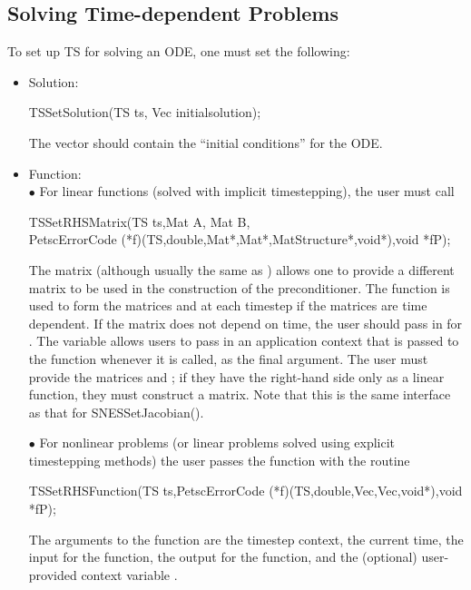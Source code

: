 \subsection{Solving Time-dependent Problems}
To set up TS for solving an ODE, one must set the following:

\begin{itemize}
\item Solution:\\
\begin{tabbing}
 TSSetSolution(TS ts, Vec initialsolution);
\end{tabbing}
The vector  should contain the ``initial conditions''
for the ODE. 

\item Function: \\
\subitem $ \bullet $ For linear functions (solved with implicit timestepping),
 the user must call 
\begin{tabbing}
 TSSetRHSMatrix(TS ts,Mat A, Mat B,\\
 PetscErrorCode (*f)(TS,double,Mat*,Mat*,MatStructure*,void*),void *fP);
\end{tabbing}
The matrix  (although usually the same as ) allows one to 
provide 
a different matrix to be used in the construction of the preconditioner.
The function  is used to form the matrices  and  
at each timestep if the matrices are time dependent.
If the matrix does not depend on time, the user should 
pass in  for .  The variable  allows 
users to pass in an application context that is passed to the  function 
whenever it is called, as the final argument. The user must provide the matrices
 and ; if they have the right-hand side only as a linear
function, they must construct a  matrix. Note that this is 
the same interface as that for SNESSetJacobian(). 

\subitem $ \bullet $  For nonlinear problems (or linear problems solved using
explicit timestepping methods) the user  passes the function with 
the routine

\begin{tabbing}
 TSSetRHSFunction(TS ts,PetscErrorCode (*f)(TS,double,Vec,Vec,void*),void *fP);
\end{tabbing}
The  arguments to the function  are
the timestep context, the current time, the input for the function,
the output for the function, and the (optional) user-provided context
variable .


\end{itemize}

